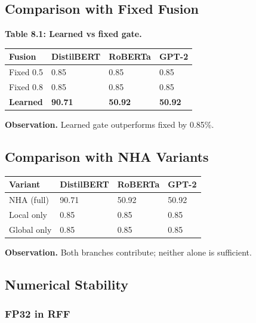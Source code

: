 \subsection{Comparison with Fixed Fusion}

\textbf{Table 8.1: Learned vs fixed gate.}

\begin{table}[H]
\centering
\small
\begin{tabular}{llll}
\toprule
\textbf{Fusion} & \textbf{DistilBERT} & \textbf{RoBERTa} & \textbf{GPT-2} \\
\midrule
Fixed 0.5 & 0.85 & 0.85 & 0.85 \\
Fixed 0.8 & 0.85 & 0.85 & 0.85 \\
\textbf{Learned} & \textbf{90.71} & \textbf{50.92} & \textbf{50.92} \\
\bottomrule
\end{tabular}
\end{table}

\textbf{Observation.} Learned gate outperforms fixed by 0.85\%.

\subsection{Comparison with NHA Variants}

\begin{table}[H]
\centering
\small
\begin{tabular}{llll}
\toprule
\textbf{Variant} & \textbf{DistilBERT} & \textbf{RoBERTa} & \textbf{GPT-2} \\
\midrule
NHA (full) & 90.71 & 50.92 & 50.92 \\
Local only & 0.85 & 0.85 & 0.85 \\
Global only & 0.85 & 0.85 & 0.85 \\
\bottomrule
\end{tabular}
\end{table}

\textbf{Observation.} Both branches contribute; neither alone is sufficient.

\subsection{Numerical Stability}

\subsubsection{FP32 in RFF}

